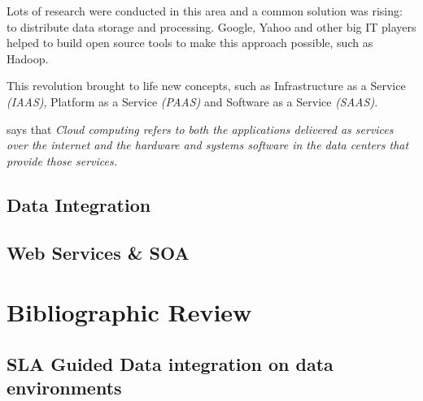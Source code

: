 \documentclass{article}
\begin{document}
Lots of research were conducted in this area and a common solution was rising: to distribute data storage and processing. Google, Yahoo and other big IT players helped to build open source tools to make this approach possible, such as Hadoop.

This revolution brought to life new concepts, such as Infrastructure as a Service \textit{(IAAS)}, Platform as a Service \textit{(PAAS)} and Software as a Service \textit{(SAAS)}. 

\cite{AViewOfCloudComputing} says that \textit{Cloud computing refers to both the applications delivered as services over the internet and the hardware and systems software in the data centers that provide those services.} 


\subsection{Data Integration}


\subsection{Web Services \& SOA}















\section{Bibliographic Review}
\subsection{SLA Guided Data integration on data environments}














\newpage

	
\end{document}
